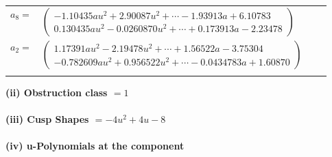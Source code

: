 \documentclass[1p]{elsarticle_modified}
\theoremstyle{definition}
\begin{document}
\begin{tabular}{m{7pt} m{180pt} m{7pt} m{180pt} }
\flushright $a_{8}=$&$\begin{pmatrix}-1.10435 a u^{2}+2.90087 u^{2}+\cdots-1.93913 a+6.10783\\0.130435 a u^{2}-0.0260870 u^{2}+\cdots+0.173913 a-2.23478\end{pmatrix}$ \\
\flushright $a_{2}=$&$\begin{pmatrix}1.17391 a u^{2}-2.19478 u^{2}+\cdots+1.56522 a-3.75304\\-0.782609 a u^{2}+0.956522 u^{2}+\cdots-0.0434783 a+1.60870\end{pmatrix}$\\&\end{tabular}
\flushleft \textbf{(ii) Obstruction class $= 1$}\\~\\
\flushleft \textbf{(iii) Cusp Shapes $= -4 u^2+4 u-8$}\\~\\
\newpage\renewcommand{\arraystretch}{1}
\flushleft \textbf{(iv) u-Polynomials at the component}\newline \\
\end{document}

